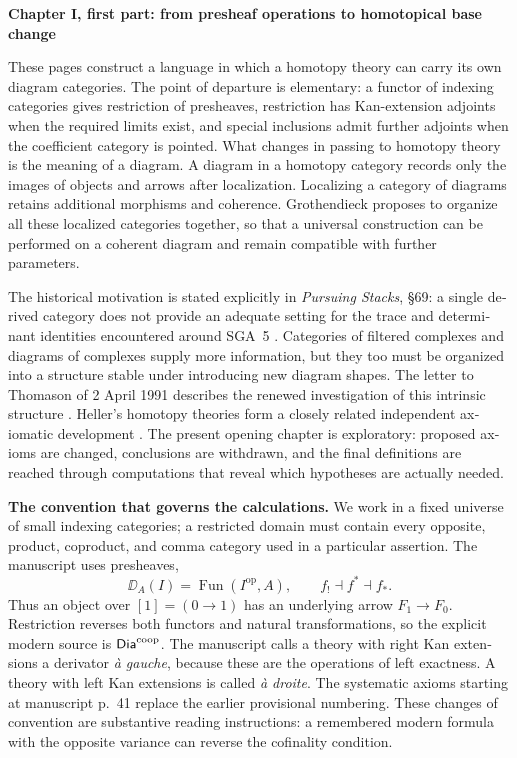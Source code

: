 \begin{otherlanguage}{english}
\noindent\textbf{Chapter I, first part: from presheaf operations to homotopical base change}

These pages construct a language in which a homotopy theory can carry its own diagram categories. The point of departure is elementary: a functor of indexing categories gives restriction of presheaves, restriction has Kan-extension adjoints when the required limits exist, and special inclusions admit further adjoints when the coefficient category is pointed. What changes in passing to homotopy theory is the meaning of a diagram. A diagram in a homotopy category records only the images of objects and arrows after localization. Localizing a category of diagrams retains additional morphisms and coherence. Grothendieck proposes to organize all these localized categories together, so that a universal construction can be performed on a coherent diagram and remain compatible with further parameters.

The historical motivation is stated explicitly in \emph{Pursuing Stacks}, \S69: a single derived category does not provide an adequate setting for the trace and determinant identities encountered around SGA~5 \citep[\S69]{Grothendieck1983}. Categories of filtered complexes and diagrams of complexes supply more information, but they too must be organized into a structure stable under introducing new diagram shapes. The letter to Thomason of 2 April 1991 describes the renewed investigation of this intrinsic structure \citep[pp.~2--4]{Grothendieck1991Letter}. Heller's homotopy theories form a closely related independent axiomatic development \citep{Heller1988}. The present opening chapter is exploratory: proposed axioms are changed, conclusions are withdrawn, and the final definitions are reached through computations that reveal which hypotheses are actually needed.

\medskip\noindent\textbf{The convention that governs the calculations.}
We work in a fixed universe of small indexing categories; a restricted domain must contain every opposite, product, coproduct, and comma category used in a particular assertion. The manuscript uses presheaves,
\[
 \DD_A(I)=\operatorname{Fun}(I^{\mathrm{op}},A),
 \qquad f_!\dashv f^*\dashv f_*.
\]
Thus an object over $[1]=(0\to1)$ has an underlying arrow $F_1\to F_0$. Restriction reverses both functors and natural transformations, so the explicit modern source is $\mathsf{Dia}^{\mathrm{coop}}$. The manuscript calls a theory with right Kan extensions a derivator \emph{\`a gauche}, because these are the operations of left exactness. A theory with left Kan extensions is called \emph{\`a droite}. The systematic axioms starting at manuscript p.~41 replace the earlier provisional numbering. These changes of convention are substantive reading instructions: a remembered modern formula with the opposite variance can reverse the cofinality condition.


\end{otherlanguage}
